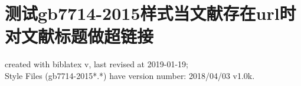 \documentclass[twoside]{article}
\makeatletter
\def\versionofgbtstyle{2018/04/03 v1.0k}
\def\versionofbiblatex{\abx@version}
\makeatother
\begin{document}
    \section{测试gb7714-2015样式当文献存在url时对文献标题做超链接}
    created with biblatex v\versionofbiblatex, last revised at 2019-01-19;\\ \hspace*{1.5em} Style Files (gb7714-2015*.*) have version number: \versionofgbtstyle.

	\nocite{*}

    \printbibliography

    
\end{document}
